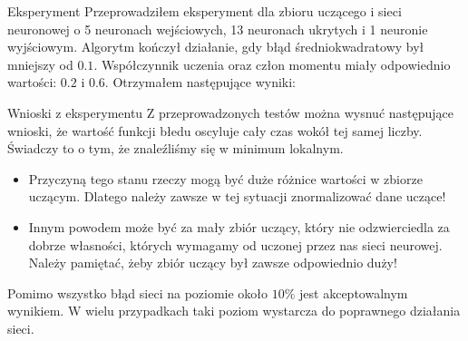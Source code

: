 \documentclass[a4paper,10pt]{beamer}
\begin{document}
		\begin{frame}{Eksperyment}
			Przeprowadziłem eksperyment dla zbioru uczącego i sieci neuronowej o 5 neuronach wejściowych, 13 neuronach ukrytych i 1 neuronie wyjściowym. Algorytm kończył działanie, gdy błąd średniokwadratowy był mniejszy od $0.1$. Współczynnik uczenia oraz człon momentu miały odpowiednio wartości: $0.2$ i $0.6$. Otrzymałem następujące wyniki:
		\end{frame}
		\begin{frame}
			\begin{center}		
			\end{center}
		\end{frame}
		\begin{frame}{Wnioski z eksperymentu}
			Z przeprowadzonych testów można wysnuć następujące wnioski, że wartość funkcji błedu oscyluje cały czas wokół tej samej liczby. Świadczy to o tym, że znaleźliśmy się w minimum lokalnym.
			\begin{itemize}
			 \item Przyczyną tego stanu rzeczy mogą być duże różnice wartości w zbiorze uczącym. Dlatego należy zawsze w tej sytuacji znormalizować dane uczące!
			\item Innym powodem może być za mały zbiór uczący, który nie odzwierciedla za dobrze własności, których wymagamy od uczonej przez nas sieci neurowej. Należy pamiętać, żeby zbiór uczący był zawsze odpowiednio duży!
			\end{itemize}
			Pomimo wszystko błąd sieci na poziomie około $10\%$ jest akceptowalnym wynikiem. W wielu przypadkach taki poziom wystarcza do poprawnego działania sieci.
		\end{frame}
\end{document}
